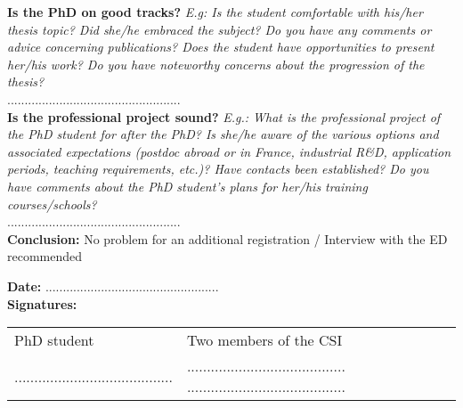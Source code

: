 \documentclass[12pt]{article}
\newcommand{\commentaire}[1]{\small\textit{#1}}
\begin{document}
\noindent\textbf{Is the PhD on good tracks?}
\commentaire{%
  E.g: Is the student comfortable with his/her thesis topic? Did
  she/he embraced the subject? Do you have any comments or advice
  concerning publications? Does the student have opportunities to
  present her/his work? Do you have noteworthy concerns about the
  progression of the thesis?\\}
..................................................
\\

\noindent\textbf{Is the professional project sound?}
\commentaire{%
  E.g.: What is the professional project of the PhD student for after
  the PhD? Is she/he aware of the various options and associated
  expectations (postdoc abroad or in France, industrial R\&D,
  application periods, teaching requirements, etc.)? Have contacts
  been established? Do you have comments about the PhD student’s
  plans for her/his training courses/schools?\\}
..................................................
\\

\noindent\textbf{Conclusion:}
No problem for an additional registration / Interview with the ED
recommended

\bigskip

\noindent\textbf{Date:}
..................................................
\\

\noindent\textbf{Signatures:}

\begin{tabular}{p{5cm}p{12cm}}
  PhD student & Two members of the CSI\\
  ........................................
  &
  ........................................
  ........................................
\end{tabular}
\end{document}
